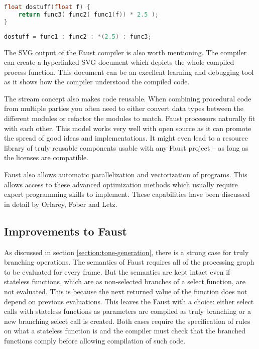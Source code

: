 \documentclass[11pt,a4paper]{article}
\begin{document}
\begin{lstlisting}[language=C,label=list:c-enclosed,caption=Enclosed statements]
float dostuff(float f) {
	return func3( func2( func1(f)) * 2.5 );
}
\end{lstlisting}

\begin{lstlisting}[language=C,label=list:faust,caption=Faust sequential composition]
dostuff = func1 : func2 : *(2.5) : func3;
\end{lstlisting}

The SVG output of the Faust compiler is also worth mentioning. The compiler can create a hyperlinked SVG document which depicts the whole compiled process function. This document can be an excellent learning and debugging tool as it shows how the compiler understood the compiled code.

The stream concept also makes code reusable. When combining procedural code from multiple parties you often need to either convert data types between the different modules or refactor the modules to match. Faust processors naturally fit with each other. This model works very well with open source as it can promote the spread of good ideas and implementations. It might even lead to a resource library of truly reusable components usable with any Faust project -- as long as the licenses are compatible.

Faust also allows automatic parallelization and vectorization of programs. This allows access to these advanced optimization methods which usually require expert programming skills to implement. These capabilities have been discussed in detail by Orlarey, Fober and Letz\cite{orlarey:09a}.

\subsection{Improvements to Faust}

As discussed in section \ref{section:tone-generation}, there is a strong case for truly branching operations. The semantics of Faust requires all of the processing graph to be evaluated for every frame. But the semantics are kept intact even if stateless functions, which are as non-selected branches of a select function, are not evaluated. This is because the next returned value of the function does not depend on previous evaluations. This leaves the Faust with a choice: either select calls with stateless functions as parameters are compiled as truly branching or a new branching select call is created. Both cases require the specification of rules on what a stateless function is and the compiler must check that the branched functions comply before allowing compilation of such code.
\end{document}
